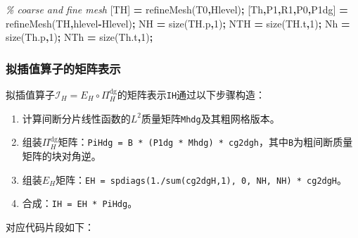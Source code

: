 \documentclass[
]{article}
\newenvironment{Shaded}{\begin{snugshade}}{\end{snugshade}}
\newcommand{\CommentTok}[1]{\textcolor[rgb]{0.56,0.35,0.01}{\textit{#1}}}
\newcommand{\FloatTok}[1]{\textcolor[rgb]{0.00,0.00,0.81}{#1}}
\newcommand{\NormalTok}[1]{#1}
\newcommand{\OperatorTok}[1]{\textcolor[rgb]{0.81,0.36,0.00}{\textbf{#1}}}
\newcommand{\VariableTok}[1]{\textcolor[rgb]{0.00,0.00,0.00}{#1}}
\providecommand{\tightlist}{%
  \setlength{\itemsep}{0pt}\setlength{\parskip}{0pt}}
\begin{document}
\begin{Shaded}
\begin{Highlighting}[]
\CommentTok{\% coarse and fine mesh}
\NormalTok{[}\VariableTok{TH}\NormalTok{] }\OperatorTok{=} \VariableTok{refineMesh}\NormalTok{(}\VariableTok{T0}\OperatorTok{,}\VariableTok{Hlevel}\NormalTok{)}\OperatorTok{;}
\NormalTok{[}\VariableTok{Th}\OperatorTok{,}\VariableTok{P1}\OperatorTok{,}\VariableTok{R1}\OperatorTok{,}\VariableTok{P0}\OperatorTok{,}\VariableTok{P1dg}\NormalTok{] }\OperatorTok{=} \VariableTok{refineMesh}\NormalTok{(}\VariableTok{TH}\OperatorTok{,}\VariableTok{hlevel}\OperatorTok{{-}}\VariableTok{Hlevel}\NormalTok{)}\OperatorTok{;}
\VariableTok{NH} \OperatorTok{=} \VariableTok{size}\NormalTok{(}\VariableTok{TH}\NormalTok{.}\VariableTok{p}\OperatorTok{,}\FloatTok{1}\NormalTok{)}\OperatorTok{;}   \VariableTok{NTH} \OperatorTok{=} \VariableTok{size}\NormalTok{(}\VariableTok{TH}\NormalTok{.}\VariableTok{t}\OperatorTok{,}\FloatTok{1}\NormalTok{)}\OperatorTok{;}
\VariableTok{Nh} \OperatorTok{=} \VariableTok{size}\NormalTok{(}\VariableTok{Th}\NormalTok{.}\VariableTok{p}\OperatorTok{,}\FloatTok{1}\NormalTok{)}\OperatorTok{;}   \VariableTok{NTh} \OperatorTok{=} \VariableTok{size}\NormalTok{(}\VariableTok{Th}\NormalTok{.}\VariableTok{t}\OperatorTok{,}\FloatTok{1}\NormalTok{)}\OperatorTok{;}
\end{Highlighting}
\end{Shaded}

\subsubsection{拟插值算子的矩阵表示}\label{ux62dfux63d2ux503cux7b97ux5b50ux7684ux77e9ux9635ux8868ux793a}

拟插值算子\(\mathcal{I}_H = E_H \circ \Pi_H^{\mathrm{dg}}\)的矩阵表示\texttt{IH}通过以下步骤构造：

\begin{enumerate}
\def\labelenumi{\arabic{enumi}.}
\tightlist
\item
  计算间断分片线性函数的\(L^2\)质量矩阵\texttt{Mhdg}及其粗网格版本。
\item
  组装\(\Pi_H^{\mathrm{dg}}\)矩阵：\texttt{PiHdg\ =\ B\ *\ (P1dg\textquotesingle{}\ *\ Mhdg)\ *\ cg2dgh}，其中\texttt{B}为粗间断质量矩阵的块对角逆。
\item
  组装\(E_H\)矩阵：\texttt{EH\ =\ spdiags(1./sum(cg2dgH,1)\textquotesingle{},\ 0,\ NH,\ NH)\ *\ cg2dgH\textquotesingle{}}。
\item
  合成：\texttt{IH\ =\ EH\ *\ PiHdg}。
\end{enumerate}

对应代码片段如下：
\end{document}
